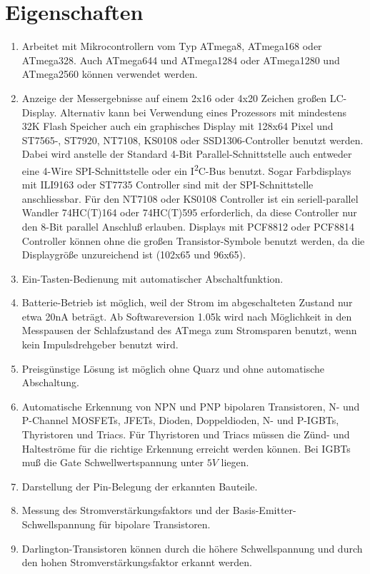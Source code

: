 \chapter{Eigenschaften}
\label{sec:features}
\begin{enumerate}
\item Arbeitet mit Mikrocontrollern vom Typ ATmega8, ATmega168 oder ATmega328. Auch ATmega644 und ATmega1284 oder ATmega1280 und ATmega2560 können verwendet werden.
\item Anzeige der Messergebnisse auf einem 2x16 oder 4x20 Zeichen großen LC-Display.
 Alternativ kann bei Verwendung eines Prozessors mit mindestens 32K Flash Speicher auch ein graphisches Display
 mit 128x64 Pixel und ST7565-, ST7920, NT7108, KS0108 oder SSD1306-Controller benutzt werden.
 Dabei wird anstelle der Standard 4-Bit Parallel-Schnittstelle
 auch entweder eine 4-Wire SPI-Schnittstelle oder ein I\textsuperscript{2}C-Bus benutzt.
 Sogar Farbdisplays mit ILI9163 oder ST7735 Controller sind mit der SPI-Schnittstelle anschliessbar.
 Für den NT7108 oder KS0108 Controller ist ein seriell-parallel Wandler 74HC(T)164 oder 74HC(T)595 erforderlich,
 da diese Controller nur den 8-Bit parallel Anschluß erlauben.
 Displays mit PCF8812 oder PCF8814 Controller können ohne die großen Transistor-Symbole benutzt werden, da
die Displaygröße unzureichend ist (102x65 und 96x65).
\item Ein-Tasten-Bedienung mit automatischer Abschaltfunktion.
\item Batterie-Betrieb ist möglich, weil der Strom im abgeschalteten Zustand nur etwa 20nA beträgt.
Ab Softwareversion 1.05k wird nach Möglichkeit in den Messpausen der Schlafzustand des ATmega zum Stromsparen benutzt, wenn kein Impulsdrehgeber benutzt wird.
\item Preisgünstige Lösung ist möglich ohne Quarz und ohne automatische Abschaltung.
\item Automatische Erkennung von NPN und PNP bipolaren Transistoren, N- und P-Channel MOSFETs, JFETs,
Dioden, Doppeldioden, N- und P-IGBTs, Thyristoren und Triacs.
Für Thyristoren und Triacs müssen die Zünd- und Halteströme für die richtige Erkennung erreicht werden können.
Bei IGBTs muß die Gate Schwellwertspannung unter \(5V\) liegen.
\item Darstellung der Pin-Belegung der erkannten Bauteile.
\item Messung des Stromverstärkungsfaktors und der Basis-Emitter-Schwellspannung für bipolare Transistoren.
\item Darlington-Transistoren können durch die höhere Schwellspannung und durch den hohen Stromverstärkungsfaktor erkannt werden.

\end{enumerate}
